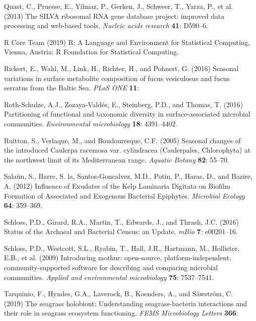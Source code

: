 \documentclass[12pt,]{article}
\begin{document}
\leavevmode\hypertarget{ref-Quast2013}{}%
Quast, C., Pruesse, E., Yilmaz, P., Gerken, J., Schweer, T., Yarza, P.,
et al. (2013) The SILVA ribosomal RNA gene database project: improved
data processing and web-based tools. \emph{Nucleic acids research}
\textbf{41}: D590--6.

\leavevmode\hypertarget{ref-RCoreTeam2019}{}%
R Core Team (2019) R: A Language and Environment for Statistical
Computing, Vienna, Austria: R Foundation for Statistical Computing.

\leavevmode\hypertarget{ref-Rickert2016}{}%
Rickert, E., Wahl, M., Link, H., Richter, H., and Pohnert, G. (2016)
Seasonal variations in surface metabolite composition of fucus
vesiculosus and fucus serratus from the Baltic Sea. \emph{PLoS ONE}
\textbf{11}:

\leavevmode\hypertarget{ref-Roth-Schulze2016}{}%
Roth-Schulze, A.J., Zozaya-Valdés, E., Steinberg, P.D., and Thomas, T.
(2016) Partitioning of functional and taxonomic diversity in
surface-associated microbial communities. \emph{Environmental
microbiology} \textbf{18}: 4391--4402.

\leavevmode\hypertarget{ref-Ruitton2005}{}%
Ruitton, S., Verlaque, M., and Boudouresque, C.F. (2005) Seasonal
changes of the introduced Caulerpa racemosa var. cylindracea
(Caulerpales, Chlorophyta) at the northwest limit of its Mediterranean
range. \emph{Aquatic Botany} \textbf{82}: 55--70.

\leavevmode\hypertarget{ref-Salaun2012}{}%
Salaün, S., Barre, S. la, Santos-Goncalvez, M.D., Potin, P., Haras, D.,
and Bazire, A. (2012) Influence of Exudates of the Kelp Laminaria
Digitata on Biofilm Formation of Associated and Exogenous Bacterial
Epiphytes. \emph{Microbial Ecology} \textbf{64}: 359--369.

\leavevmode\hypertarget{ref-Schloss2016}{}%
Schloss, P.D., Girard, R.A., Martin, T., Edwards, J., and Thrash, J.C.
(2016) Status of the Archaeal and Bacterial Census: an Update.
\emph{mBio} \textbf{7}: e00201--16.

\leavevmode\hypertarget{ref-Schloss2009}{}%
Schloss, P.D., Westcott, S.L., Ryabin, T., Hall, J.R., Hartmann, M.,
Hollister, E.B., et al. (2009) Introducing mothur: open-source,
platform-independent, community-supported software for describing and
comparing microbial communities. \emph{Applied and environmental
microbiology} \textbf{75}: 7537--7541.

\leavevmode\hypertarget{ref-Tarquinio2019}{}%
Tarquinio, F., Hyndes, G.A., Laverock, B., Koenders, A., and Säwström,
C. (2019) The seagrass holobiont: Understanding seagrass-bacteria
interactions and their role in seagrass ecosystem functioning.
\emph{FEMS Microbiology Letters} \textbf{366}:
\end{document}
